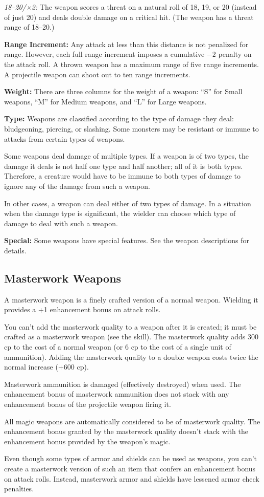 \textit{18--20/×2:} The weapon scores a threat on a natural roll of 18, 19, or 20 (instead of just 20) and deals double damage on a critical hit. (The weapon has a threat range of 18--20.)

\textbf{Range Increment:} Any attack at less than this distance is not penalized for range. However, each full range increment imposes a cumulative $-2$ penalty on the attack roll. A thrown weapon has a maximum range of five range increments. A projectile weapon can shoot out to ten range increments.

\textbf{Weight:} There are three columns for the weight of a weapon: ``S'' for Small weapons, ``M'' for Medium weapons, and ``L'' for Large weapons.

\textbf{Type:} Weapons are classified according to the type of damage they deal: bludgeoning, piercing, or slashing. Some monsters may be resistant or immune to attacks from certain types of weapons.

Some weapons deal damage of multiple types. If a weapon is of two types, the damage it deals is not half one type and half another; all of it is both types. Therefore, a creature would have to be immune to both types of damage to ignore any of the damage from such a weapon.

In other cases, a weapon can deal either of two types of damage. In a situation when the damage type is significant, the wielder can choose which type of damage to deal with such a weapon.

\textbf{Special:} Some weapons have special features. See the weapon descriptions for details.



\subsection{Masterwork Weapons}
A masterwork weapon is a finely crafted version of a normal weapon. Wielding it provides a +1 enhancement bonus on attack rolls.

You can't add the masterwork quality to a weapon after it is created; it must be crafted as a masterwork weapon (see the  skill). The masterwork quality adds 300 cp to the cost of a normal weapon (or 6 cp to the cost of a single unit of ammunition). Adding the masterwork quality to a double weapon costs twice the normal increase (+600 cp).

Masterwork ammunition is damaged (effectively destroyed) when used. The enhancement bonus of masterwork ammunition does not stack with any enhancement bonus of the projectile weapon firing it.

All magic weapons are automatically considered to be of masterwork quality. The enhancement bonus granted by the masterwork quality doesn't stack with the enhancement bonus provided by the weapon's magic.

Even though some types of armor and shields can be used as weapons, you can't create a masterwork version of such an item that confers an enhancement bonus on attack rolls. Instead, masterwork armor and shields have lessened armor check penalties.

